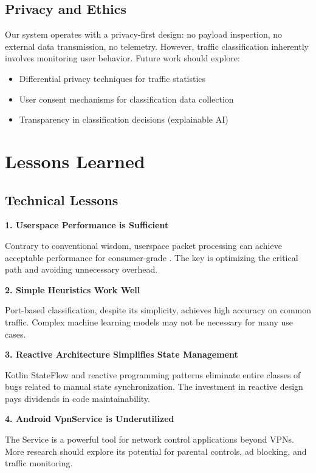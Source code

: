 \subsection{Privacy and Ethics}

Our system operates with a privacy-first design: no payload inspection, no external data transmission, no telemetry. However, traffic classification inherently involves monitoring user behavior. Future work should explore:
\begin{itemize}
    \item Differential privacy techniques for traffic statistics
    \item User consent mechanisms for classification data collection
    \item Transparency in classification decisions (explainable AI)
\end{itemize}

\section{Lessons Learned}
\label{sec:lessons-learned}

\subsection{Technical Lessons}

\textbf{1. Userspace Performance is Sufficient}

Contrary to conventional wisdom, userspace packet processing can achieve acceptable performance for consumer-grade \qos. The key is optimizing the critical path and avoiding unnecessary overhead.

\textbf{2. Simple Heuristics Work Well}

Port-based classification, despite its simplicity, achieves high accuracy on common traffic. Complex machine learning models may not be necessary for many use cases.

\textbf{3. Reactive Architecture Simplifies State Management}

Kotlin StateFlow and reactive programming patterns eliminate entire classes of bugs related to manual state synchronization. The investment in reactive design pays dividends in code maintainability.

\textbf{4. Android VpnService is Underutilized}

The \vpn Service \api is a powerful tool for network control applications beyond VPNs. More research should explore its potential for parental controls, ad blocking, and traffic monitoring.

